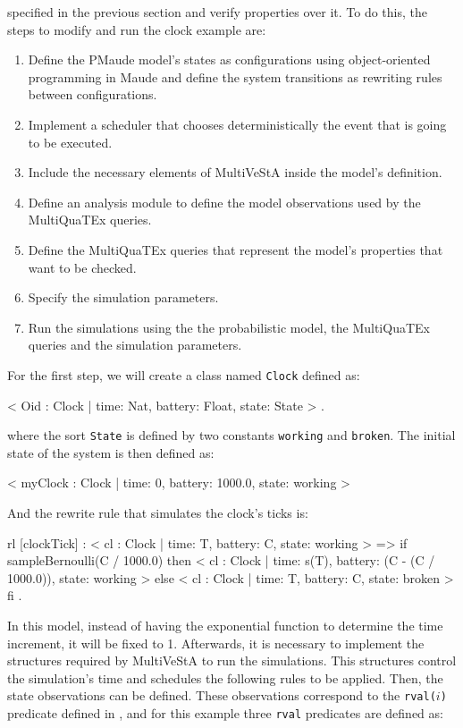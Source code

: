 specified in the previous section and verify properties over it. To do this, the steps to modify and run the clock example are:
\begin{enumerate}
    \item Define the PMaude model's states as configurations using object-oriented programming in Maude and define the system transitions as rewriting rules between configurations.
    \item Implement a scheduler that chooses deterministically the event that is going to be executed.
    \item Include the necessary elements of MultiVeStA inside the model's definition.
    \item Define an analysis module to define the model observations used by the MultiQuaTEx queries.
    \item Define the MultiQuaTEx queries that represent the model's properties that want to be checked.
    \item Specify the simulation parameters.
    \item Run the simulations using the the probabilistic model, the MultiQuaTEx queries and the simulation parameters.
\end{enumerate} 
For the first step, we will create a class named \texttt{Clock} defined as:
\\
\begin{maude}
< Oid : Clock | time: Nat, battery: Float, state: State > .
\end{maude}
where the sort \texttt{State} is defined by two constants \texttt{working} and \texttt{broken}. The initial state of the system is then defined as:
\\
\begin{maude}
< myClock : Clock  | time: 0, battery: 1000.0, state: working >
\end{maude}
And the rewrite rule that simulates the clock's ticks is:
\\
\begin{maude}
rl [clockTick] :
    < cl : Clock  | time: T, battery: C, state: working > 
  =>
    if sampleBernoulli(C / 1000.0) then
      < cl : Clock  | time: s(T), battery: (C - (C / 1000.0)),
        state: working >
    else
      < cl : Clock  | time: T, battery: C, state: broken >
    fi .
\end{maude}
In this model, instead of having the exponential function to determine the time increment, it will be fixed to 1. Afterwards, it is necessary to implement the structures required by MultiVeStA to run the simulations. This structures control the simulation's time and schedules the following rules to be applied. Then, the state observations can be defined. These observations correspond to the \texttt{rval($i$)} predicate defined in \cite{Agha2006,multivesta}, and for this example three \texttt{rval} predicates are defined as:
